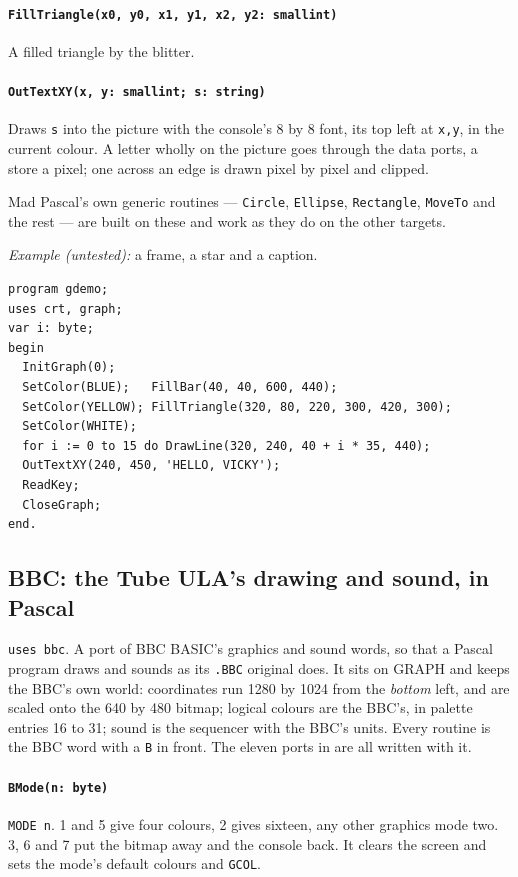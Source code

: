 \paragraph{\texttt{FillTriangle(x0, y0, x1, y1, x2, y2: smallint)}} A filled
triangle by the blitter.

\paragraph{\texttt{OutTextXY(x, y: smallint; s: string)}} Draws \verb|s| into
the picture with the console's 8 by 8 font, its top left at \verb|x,y|, in the
current colour. A letter wholly on the picture goes through the data ports, a
store a pixel; one across an edge is drawn pixel by pixel and clipped.

\noindent Mad Pascal's own generic routines --- \verb|Circle|,
\verb|Ellipse|, \verb|Rectangle|, \verb|MoveTo| and the rest --- are built on
these and work as they do on the other targets.

\noindent\emph{Example (untested):} a frame, a star and a caption.

\begin{verbatim}
program gdemo;
uses crt, graph;
var i: byte;
begin
  InitGraph(0);
  SetColor(BLUE);   FillBar(40, 40, 600, 440);
  SetColor(YELLOW); FillTriangle(320, 80, 220, 300, 420, 300);
  SetColor(WHITE);
  for i := 0 to 15 do DrawLine(320, 240, 40 + i * 35, 440);
  OutTextXY(240, 450, 'HELLO, VICKY');
  ReadKey;
  CloseGraph;
end.
\end{verbatim}

\subsection*{BBC: the Tube ULA's drawing and sound, in Pascal}
\verb|uses bbc|. A port of BBC BASIC's graphics and sound words, so that a
Pascal program draws and sounds as its \texttt{.BBC} original does. It sits
on GRAPH and keeps the BBC's own world: coordinates run 1280 by 1024 from the
\emph{bottom} left, and are scaled onto the 640 by 480 bitmap; logical
colours are the BBC's, in palette entries 16 to 31; sound is the sequencer
with the BBC's units. Every routine is the BBC word with a \verb|B| in front.
The eleven ports in  are all written with it.

\paragraph{\texttt{BMode(n: byte)}} \verb|MODE n|. 1 and 5 give four colours, 2
gives sixteen, any other graphics mode two. 3, 6 and 7 put
the bitmap away and the console back. It clears the screen and sets the
mode's default colours and \verb|GCOL|.

